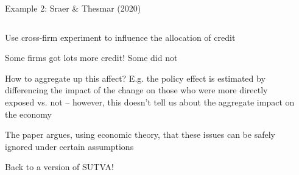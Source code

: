 \documentclass[notes,11pt, aspectratio=169]{beamer}
\newenvironment{wideitemize}{\itemize\addtolength{\itemsep}{10pt}}{\enditemize}
\begin{document}
\begin{frame}{Example 2: Sraer \& Thesmar (2020)}
\begin{columns}[T] %
  \begin{column}{.5\textwidth}
    \begin{wideitemize}
    \item Use cross-firm experiment to influence the allocation of credit
    \item Some firms got lots more credit! Some did not
    \item How to aggregate up this affect? E.g. the policy effect is
      estimated by differencing the impact of the change on those who
      were more directly exposed vs. not -- however, this doesn't tell
      us about the aggregate impact on the economy
    \item The paper argues, using economic theory, that these issues can be safely ignored under certain assumptions
    \item Back to a version of SUTVA!
    \end{wideitemize}
  \end{column}%
  \hfill%
  \begin{column}{.5\textwidth}
    \begin{center}
    \end{center}
  \end{column}
\end{columns}

\end{frame}
\end{document}
